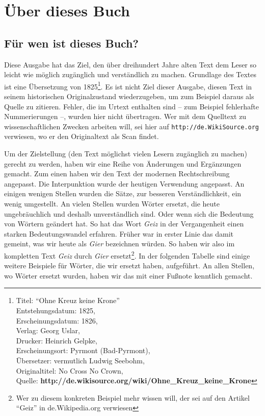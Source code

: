 

\part{Über dieses Buch}


\chapter{Für wen ist dieses Buch?}

Diese Ausgabe hat das Ziel, den über dreihundert Jahre alten Text dem Leser
so leicht wie möglich zugänglich und verständlich zu machen. Grundlage
des Textes ist eine Übersetzung von 1825\footnote{
Titel: "`Ohne Kreuz keine Krone"' \\
Entstehungsdatum: 1825, \\
Erscheinungsdatum: 1826, \\
Verlag: Georg Uslar, \\
Drucker: Heinrich Gelpke, \\
Erscheinungsort: Pyrmont (Bad-Pyrmont),\\
Übersetzer: vermutlich Ludwig Seebohm, \\
Originaltitel: No Cross No Crown, \\
Quelle: \textbf{http://de.wikisource.org/wiki/Ohne\_Kreuz\_keine\_Krone}}. Es
ist nicht Ziel dieser Ausgabe, diesen Text in seinem historischen Originalzustand wiederzugeben, um zum Beispiel daraus als Quelle zu zitieren. Fehler, die im
Urtext enthalten sind -- zum Beispiel fehlerhafte Nummerierungen --, wurden hier nicht
übertragen. Wer mit dem Quelltext zu wissenschaftlichen Zwecken arbeiten will,
sei hier auf \texttt{http://de.WikiSource.org} verwiesen, wo er den
Originaltext als Scan findet.

\medskip

Um der Zielstellung (den Text möglichst vielen Lesern zugänglich zu machen)
gerecht zu werden, haben wir eine Reihe von Änderungen und Ergänzungen gemacht.
Zum einen haben wir den Text der modernen Rechtschreibung angepasst. Die
Interpunktion wurde der heutigen Verwendung angepasst. An einigen wenigen Stellen
wurden die Sätze, zur besseren Verständlichkeit, ein wenig umgestellt. An vielen
Stellen wurden Wörter ersetzt, die heute ungebräuchlich und deshalb
unverständlich sind. Oder wenn sich die Bedeutung von Wörtern geändert hat. So
hat das Wort \textit{Geiz} in der Vergangenheit einen starken Bedeutungswandel
erfahren. Früher war in erster Linie das damit gemeint, was wir heute als
\textit{Gier} bezeichnen würden. So haben wir also im kompletten Text
\textit{Geiz} durch \textit{Gier} ersetzt\footnote{Wer zu diesem konkreten
Beispiel mehr wissen will, der sei auf den Artikel "`Geiz"' in de.Wikipedia.org
verwiesen}. In der folgenden Tabelle sind einige
weitere Beispiele für Wörter, die wir ersetzt haben, aufgeführt. An allen
Stellen, wo Wörter ersetzt wurden, haben wir das mit einer Fußnote kenntlich
gemacht.


